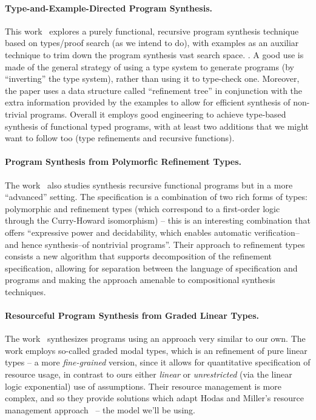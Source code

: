 \documentclass{llncs}
\newcommand{\mypara}[1]{\paragraph{\textbf{#1}.}}
\begin{document}
\mypara{Type-and-Example-Directed Program Synthesis} This
work~\cite{DBLP:conf/pldi/OseraZ15,DBLP:conf/popl/FrankleOWZ16}
explores a purely functional, recursive program synthesis technique
based on types/proof search (as we intend to do), with examples as an
auxiliar technique to trim down the program synthesis vast search
space.  .  A good use is
made of the general strategy of using a type system to generate
programs (by ``inverting'' the type system), rather than using it to
type-check one.  Moreover, the paper uses a data structure called
``refinement tree'' in conjunction with the extra information provided
by the examples to allow for efficient synthesis of non-trivial
programs. Overall it employs good engineering to achieve type-based
synthesis of functional typed programs, with at least two additions
that we might want to follow too (type refinements and recursive
functions).

  
\mypara{Program Synthesis from Polymorfic Refinement Types} The
work~\cite{DBLP:conf/pldi/PolikarpovaKS16} also studies synthesis
recursive functional programs but in a more ``advanced'' setting. The
specification is a combination of two rich forms of types: polymorphic and
refinement types (which correspond to a first-order logic through the
Curry-Howard isomorphism) -- this is an interesting combination that offers
``expressive power and decidability, which enables automatic
verification--and hence synthesis--of nontrivial programs''.  Their
approach to refinement types consists a new algorithm that supports
decomposition of the refinement specification, allowing for separation
between the language of specification and programs and making the
approach amenable to compositional synthesis techniques.


\mypara{Resourceful Program Synthesis from Graded Linear Types} The
work~\cite{DBLP:conf/lopstr/HughesO20} synthesizes programs using an
approach very similar to our own.  The work employs so-called graded
modal types, which is an refinement of pure linear types -- a more
\emph{fine-grained} version, since it allows for quantitative
specification of resource usage, in contrast to ours either
\emph{linear} or \emph{unrestricted} (via the linear logic
exponential) use of assumptions.  Their resource management is more
complex, and so they provide solutions which adapt Hodas and Miller's
resource management approach~\cite{DBLP:journals/tcs/CervesatoHP00,DBLP:journals/tcs/LiangM09} -- the model we'll be using.
\end{document}
